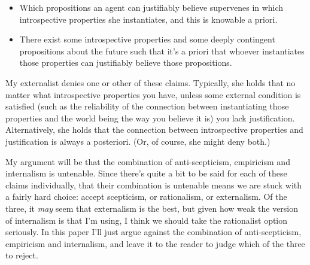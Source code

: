 \documentclass[
  11pt,
  letterpaper,
  DIV=11,
  numbers=noendperiod,
  oneside]{scrartcl}
\begin{document}
\begin{itemize}
\item
  Which propositions an agent can justifiably believe supervenes in
  which introspective properties she instantiates, and this is knowable
  a priori.
\item
  There exist some introspective properties and some deeply contingent
  propositions about the future such that it's a priori that whoever
  instantiates those properties can justifiably believe those
  propositions.
\end{itemize}

My externalist denies one or other of these claims. Typically, she holds
that no matter what introspective properties you have, unless some
external condition is satisfied (such as the reliability of the
connection between instantiating those properties and the world being
the way you believe it is) you lack justification. Alternatively, she
holds that the connection between introspective properties and
justification is always a posteriori. (Or, of course, she might deny
both.)

My argument will be that the combination of anti-scepticism, empiricism
and internalism is untenable. Since there's quite a bit to be said for
each of these claims individually, that their combination is untenable
means we are stuck with a fairly hard choice: accept scepticism, or
rationalism, or externalism. Of the three, it \emph{may} seem that
externalism is the best, but given how weak the version of internalism
is that I'm using, I think we should take the rationalist option
seriously. In this paper I'll just argue against the
combination of anti-scepticism, empiricism and internalism, and leave it
to the reader to judge which of the three to reject.
\end{document}
